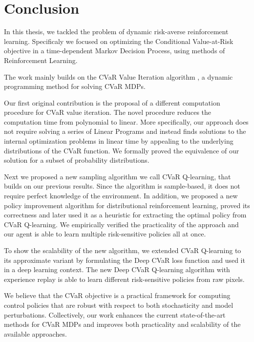 \chapter{Conclusion}\label{ch:conclusion}

In this thesis, we tackled the problem of dynamic risk-averse reinforcement learning. Specificaly we focused on optimizing the Conditional Value-at-Risk objective in a time-dependent Markov Decision Process, using methods of Reinforcement Learning.

The work mainly builds on the CVaR Value Iteration algorithm \citep{chow2015risk}, a dynamic programming method for solving CVaR MDPs. 

Our first original contribution is the proposal of a different computation procedure for CVaR value iteration. The novel procedure reduces the computation time from polynomial to linear. More specifically, our approach does not require solving a series of Linear Programs and instead finds solutions to the internal optimization problems in linear time by appealing to the underlying distributions of the CVaR function. We formally proved the equivalence of our solution for a subset of probability distributions.

Next we proposed a new sampling algorithm we call CVaR Q-learning, that builds on our previous results. Since the algorithm is sample-based, it does not require perfect knowledge of the environment. 
In addition, we proposed a new policy improvement algorithm for distributional reinforcement learning, proved its correctness and later used it as a heuristic for extracting the optimal policy from CVaR Q-learning. We empirically verified the practicality of the approach and our agent is able to learn multiple risk-sensitive policies all at once.

To show the scalability of the new algorithm, we extended CVaR Q-learning to its approximate variant by formulating the Deep CVaR loss function and used it in a deep learning context. The new Deep CVaR Q-learning algorithm with experience replay is able to learn different risk-sensitive policies from raw pixels.


We believe that the CVaR objective is a practical framework for computing control policies that are robust with respect to both stochasticity and model perturbations. Collectively, our work enhances the current state-of-the-art methods for CVaR MDPs and improves both practicality and scalability of the available approaches. 


